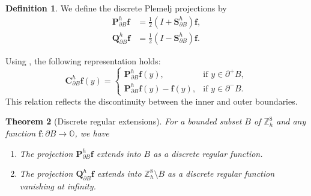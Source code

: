 \documentclass{amsart}
\newtheorem{theorem}{Theorem}[section]
\theoremstyle{definition}
\newtheorem{definition}[theorem]{Definition}
\theoremstyle{remark}
\numberwithin{equation}{section}
\newcommand{\p}{\partial}
\newcommand{\OO}{\mathbb O}
\newcommand{\Z}{\mathbb Z}
\newcommand{\f}{\bm{f}}
\begin{document}
	
	\begin{definition}
		We define the discrete Plemelj projections by
		\begin{align*}
			\bm P^h _{\p B} \f &= \frac{1}{2}(I+\bm S^h_{\p B})\f, \\
			\bm Q^h_{\p B} \f &= \frac{1}{2}(I- \bm S^h_{\p B})\f.
		\end{align*}
	\end{definition}
	
	Using , the following representation holds:
	\begin{equation}\label{2023-09-29 10:57:15}
		\bm C^h_{\p B} \f(y) =
		\begin{cases}
			\bm P^h_{\p B} \f(y), & \text{if } y \in \p^+ B, \\
			\bm P^h_{\p B} \f(y) - \f(y), & \text{if } y \in \p^- B.
		\end{cases}
	\end{equation}
	This relation reflects the discontinuity between the inner and outer boundaries.




\begin{theorem}[Discrete regular extensions]\label{2023-09-29 17:27:26}
For  a bounded subset \(B\) of \(\Z^8_h\) and any function \(\f : \p B \rightarrow \OO\), we have
	\begin{enumerate}
		\item The projection $\bm P^h_{\p B} \f$ extends into $B$ as a discrete regular function.
		\item The projection $\bm Q^h_{\p B} \f$ extends into $\Z^8_h \setminus B$ as a discrete regular function vanishing at infinity.
	\end{enumerate}
\end{theorem}
\end{document}
